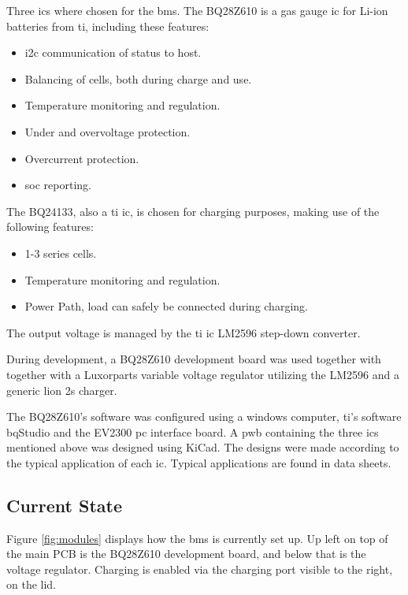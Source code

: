 Three \gls{ic}s where chosen for the \gls{bms}. The BQ28Z610 is a gas gauge \gls{ic} for Li-ion batteries from \gls{ti}, including these features:

\begin{itemize}[noitemsep]
	\item \gls{i2c} communication of status to host.
	\item Balancing of cells, both during charge and use.
	\item Temperature monitoring and regulation.
	\item Under and overvoltage protection.
	\item Overcurrent protection.
	\item \gls{soc} reporting.
\end{itemize}

The BQ24133, also a \gls{ti} \gls{ic}, is chosen for charging purposes, making use of the following features:

\begin{itemize}[noitemsep]
	\item 1-3 series cells.
	\item Temperature monitoring and regulation.
	\item Power Path, load can safely be connected during charging.
\end{itemize}

The output voltage is managed by the \gls{ti} \gls{ic} LM2596 step-down converter.

During development, a BQ28Z610 development board was used together with together with a Luxorparts variable voltage regulator utilizing the LM2596 and a generic \gls{lion} \gls{2s} charger.

The BQ28Z610's software was configured using a windows computer, \gls{ti}'s software bqStudio\cite{bqStudio} and the EV2300 \gls{pc} interface board.
A \gls{pwb} containing the three \gls{ic}s mentioned above was designed using KiCad\cite{kicad}. The designs were made according to the typical application of each \gls{ic}. Typical applications are found in data sheets.  

\subsection{Current State}
Figure \autoref{fig:modules} displays how the \gls{bms} is currently set up. Up left on top of the main PCB is the BQ28Z610 development board, and below that is the voltage regulator. Charging is enabled via the charging port visible to the right, on the lid.

